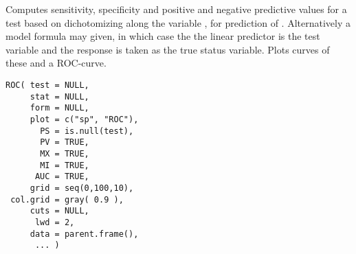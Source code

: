 \begin{Description}\relax
Computes sensitivity, specificity and positive and negative predictive
values for a test based on dichotomizing along the variable
, for prediction of . Alternatively a
model formula may given, in which case the the linear predictor is the
test variable and the response is taken as the true status variable.
Plots curves of these and a ROC-curve.
\end{Description}
\begin{Usage}
\begin{verbatim}
ROC( test = NULL,
     stat = NULL,
     form = NULL,
     plot = c("sp", "ROC"),
       PS = is.null(test),    
       PV = TRUE,             
       MX = TRUE,             
       MI = TRUE,             
      AUC = TRUE,             
     grid = seq(0,100,10),
 col.grid = gray( 0.9 ),
     cuts = NULL,
      lwd = 2,
     data = parent.frame(), 
      ... )
\end{verbatim}
\end{Usage}
